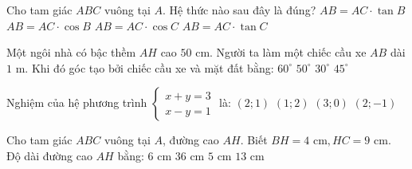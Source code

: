 \documentclass[12pt,a4paper]{article}
\begin{document}
\begin{ex}
Cho tam giác $ABC$ vuông tại $A$. Hệ thức nào sau đây là đúng?
\choice
{$AB = AC \cdot \tan B$}
{$AB = AC \cdot \cos B$}
{$AB = AC \cdot \cos C$}
{\True $AB = AC \cdot \tan C$}
\end{ex}

\begin{ex}
Một ngôi nhà có bậc thềm $AH$ cao $50\text{ cm}$. Người ta làm một chiếc cầu xe $AB$ dài $1\text{ m}$. Khi đó góc tạo bởi chiếc cầu xe và mặt đất bằng:
\choice
{$60^\circ$}
{$50^\circ$}
{\True $30^\circ$}
{$45^\circ$}
\end{ex}

\begin{ex}
Nghiệm của hệ phương trình $\begin{cases} x + y = 3 \\ x - y = 1 \end{cases}$ là:
\choice
{\True $(2; 1)$}
{$(1; 2)$}
{$(3; 0)$}
{$(2; -1)$}
\end{ex}

\begin{ex}
Cho tam giác $ABC$ vuông tại $A$, đường cao $AH$. Biết $BH = 4\text{ cm}, HC = 9\text{ cm}$. Độ dài đường cao $AH$ bằng:
\choice
{\True $6\text{ cm}$}
{$36\text{ cm}$}
{$5\text{ cm}$}
{$13\text{ cm}$}
\end{ex}
\end{document}
